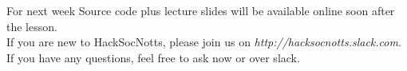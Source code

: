 \documentclass{beamer}
\begin{document}
\begin{frame}{For next week}
Source code plus lecture slides will be available online soon after the lesson.\\
If you are new to HackSocNotts, please join us on \textit{http://hacksocnotts.slack.com}.\\
If you have any questions, feel free to ask now or over slack.\\
\end{frame}
\end{document}
